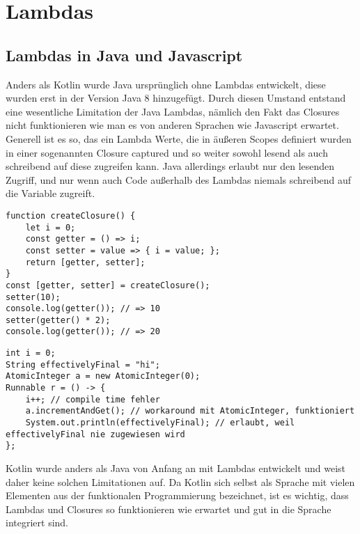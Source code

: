 
\section{Lambdas}\label{sec:lambdas}

\renewcommand{\kapitelautor}{Autor: Marvin Kurka}

\subsection{Lambdas in Java und Javascript}
Anders als Kotlin wurde Java ursprünglich ohne Lambdas entwickelt, diese wurden erst in der Version Java 8 hinzugefügt.
Durch diesen Umstand entstand eine wesentliche Limitation der Java Lambdas, nämlich den Fakt das Closures nicht
funktionieren wie man es von anderen Sprachen wie \zB Javascript erwartet.
Generell ist es so, das ein Lambda Werte, die in äußeren Scopes definiert wurden in einer sogenannten Closure captured
und so weiter sowohl lesend als auch schreibend auf diese zugreifen kann.
Java allerdings erlaubt nur den lesenden Zugriff, und nur wenn auch Code außerhalb des Lambdas niemals schreibend auf
die Variable zugreift.\cite{mdnDocsClosures, jarticleLambdas}

\begin{verbatim}
function createClosure() {
    let i = 0;
    const getter = () => i;
    const setter = value => { i = value; };
    return [getter, setter];
}
const [getter, setter] = createClosure();
setter(10);
console.log(getter()); // => 10
setter(getter() * 2);
console.log(getter()); // => 20
\end{verbatim}

\begin{verbatim}
int i = 0;
String effectivelyFinal = "hi";
AtomicInteger a = new AtomicInteger(0);
Runnable r = () -> {
    i++; // compile time fehler
    a.incrementAndGet(); // workaround mit AtomicInteger, funktioniert
    System.out.println(effectivelyFinal); // erlaubt, weil effectivelyFinal nie zugewiesen wird
};
\end{verbatim}

Kotlin wurde anders als Java von Anfang an mit Lambdas entwickelt und weist daher keine solchen Limitationen auf.
Da Kotlin sich selbst als Sprache mit vielen Elementen aus der funktionalen Programmierung bezeichnet, ist es wichtig,
dass Lambdas und Closures so funktionieren wie erwartet und gut in die Sprache integriert sind.\cite{kspecIntroduction}

